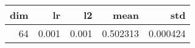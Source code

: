 \begin{tabular}{rrrrr}
\toprule
 dim &     lr &     l2 &      mean &       std \\
\midrule
  64 &  0.001 &  0.001 &  0.502313 &  0.000424 \\
\bottomrule
\end{tabular}

